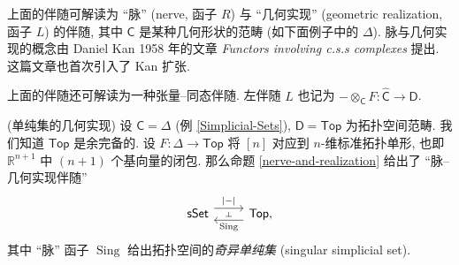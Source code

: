 \begin{remark}
	{}
	上面的伴随可解读为 ``脉'' (nerve, 函子 $R$) 与 ``几何实现'' (geometric realization, 函子 $L$) 的伴随, 其中 $\mathsf C$ 是某种几何形状的范畴 (如下面例子中的 $\Delta$).
	脉与几何实现的概念由 Daniel Kan 1958 年的文章 \emph{Functors involving c.s.s complexes} 提出. 这篇文章也首次引入了 Kan 扩张.
\end{remark}

\begin{remark}
	{}
	上面的伴随还可解读为一种张量--同态伴随. 左伴随 $L$ 也记为 ${-}\otimes_{\mathsf C}F\colon \widehat {\mathsf C}\to\mathsf D$.
\end{remark}

\begin{example}
	{(单纯集的几何实现)}
	设 $\mathsf C = \Delta$ (例 \ref{Simplicial-Sets}),
	$\mathsf D=\mathsf {Top}$ 为拓扑空间范畴.
	我们知道 $\mathsf {Top}$ 是余完备的.
	设 $F \colon \Delta \to \mathsf {Top}$ 将 $[n]$ 对应到 $n$-维标准拓扑单形, 也即 $\mathbb{R}^{n+1}$ 中 $(n+1)$ 个基向量的闭包.
	那么命题 \ref{nerve-and-realization} 给出了 ``脉--几何实现伴随''
	\[\begin{tikzcd}[ampersand replacement=\&]
		{\mathsf {sSet}} \& {\mathsf {Top},}
		\arrow[""{name=0, anchor=center, inner sep=0}, "|{-}|", shift left=2, from=1-1, to=1-2]
		\arrow[""{name=1, anchor=center, inner sep=0}, "\operatorname{Sing}", shift left=2, from=1-2, to=1-1]
		\arrow["\dashv"{anchor=center, rotate=-90}, draw=none, from=0, to=1]
	\end{tikzcd}\]
	其中 ``脉'' 函子 $\operatorname{Sing}$ 给出拓扑空间的\emph{奇异单纯集} (singular simplicial set).
\end{example}

